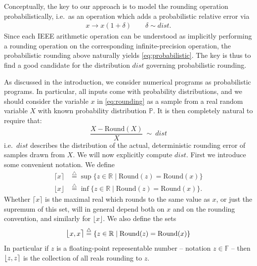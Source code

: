 \documentclass[10pt,conference]{IEEEtran}
\newcommand{\ie}{i.e.\ }
\newcommand{\round}{\mathrm{Round}}
\newcommand{\ceil}[1]{\lceil #1 \rceil}
\newcommand{\floor}[1]{\lfloor #1 \rfloor}
\newcommand{\fintvl}[1][x]{\mathlarger{\lfloor}#1,#1\mathlarger{\rceil}}
\newcommand{\F}{\mathbb{F}}
\newcommand{\R}{\mathbb{R}}
\begin{document}
Conceptually, the key to our approach is to model the rounding operation probabilistically, \ie as an operation which adds a probabilistic relative error via
\begin{align}
x \longrightarrow x(1+\delta)\qquad \delta\sim dist.\label{eq:rounding}
\end{align}
Since each IEEE arithmetic operation can be understood as implicitly performing a rounding operation on the corresponding infinite-precision operation, the probabilistic rounding above naturally yields \cref{eq:probabilistic}. The key is thus to find a good candidate for the distribution $dist$ governing probabilistic rounding.

As discussed in the introduction, we consider numerical programs as probabilistic programs. In particular, all inputs come with probability distributions, and we should consider the variable $x$ in \cref{eq:rounding} as a sample from a real random variable $X$ with known probability distribution $\mathbb{P}$. It is then completely natural to require that:
\[
\frac{X-\round(X)}{X}~\sim~dist
\]
\ie $dist$ describes the distribution of the actual, deterministic rounding error of samples drawn from $X$. We will now explicitly compute $dist$. First we introduce some convenient notation. We define
\begin{align*}
\ceil{x}&\stackrel{\triangle}{=}\sup\{z\in\R\mid \round(z)=\round(x)\}\\
\floor{x}&\stackrel{\triangle}{=}\inf\{z\in\R\mid \round(z)=\round(x)\}.
\end{align*}
Whether $\ceil{x}$ is the maximal real which rounds to the same value as $x$, or just the supremum of this set, will in general depend both on $x$ and on the rounding convention, and similarly for $\floor{x}$. We also define the sets 
\[
\fintvl\stackrel{\triangle}{=}\left\{z\in\R\mid \round(z)=\round(x)\right\}
\]  
In particular if $z$ is a floating-point representable number -- notation $z\in\F$ -- then $\fintvl[z]$ is the collection of all reals rounding to $z$.
\end{document}
